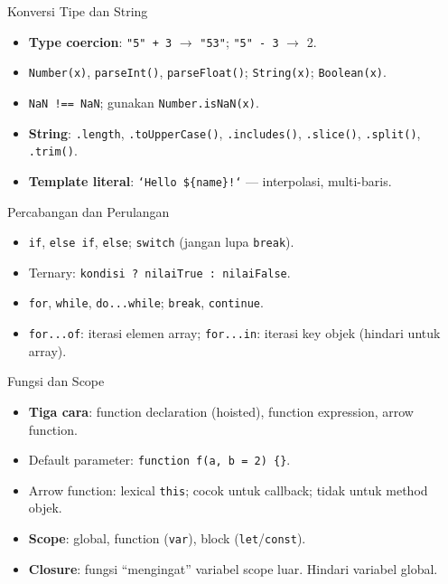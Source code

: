 \documentclass[handout]{beamer}
\begin{document}
\begin{frame}{Konversi Tipe dan String}
	\begin{itemize}
		\item \textbf{Type coercion}: \texttt{"5" + 3} $\to$ \texttt{"53"}; \texttt{"5" - 3} $\to$ 2.
		\item \texttt{Number(x)}, \texttt{parseInt()}, \texttt{parseFloat()}; \texttt{String(x)}; \texttt{Boolean(x)}.
		\item \texttt{NaN !== NaN}; gunakan \texttt{Number.isNaN(x)}.
		\item \textbf{String}: \texttt{.length}, \texttt{.toUpperCase()}, \texttt{.includes()}, \texttt{.slice()}, \texttt{.split()}, \texttt{.trim()}.
		\item \textbf{Template literal}: \texttt{`Hello \$\{name\}!`} --- interpolasi, multi-baris.
	\end{itemize}
\end{frame}

\begin{frame}{Percabangan dan Perulangan}
	\begin{itemize}
		\item \texttt{if}, \texttt{else if}, \texttt{else}; \texttt{switch} (jangan lupa \texttt{break}).
		\item Ternary: \texttt{kondisi ? nilaiTrue : nilaiFalse}.
		\item \texttt{for}, \texttt{while}, \texttt{do...while}; \texttt{break}, \texttt{continue}.
		\item \texttt{for...of}: iterasi elemen array; \texttt{for...in}: iterasi key objek (hindari untuk array).
	\end{itemize}
\end{frame}

\begin{frame}{Fungsi dan Scope}
	\begin{itemize}
		\item \textbf{Tiga cara}: function declaration (hoisted), function expression, arrow function.
		\item Default parameter: \texttt{function f(a, b = 2) \{\}}.
		\item Arrow function: lexical \texttt{this}; cocok untuk callback; tidak untuk method objek.
		\item \textbf{Scope}: global, function (\texttt{var}), block (\texttt{let}/\texttt{const}).
		\item \textbf{Closure}: fungsi ``mengingat'' variabel scope luar. Hindari variabel global.
	\end{itemize}
\end{frame}
\end{document}
